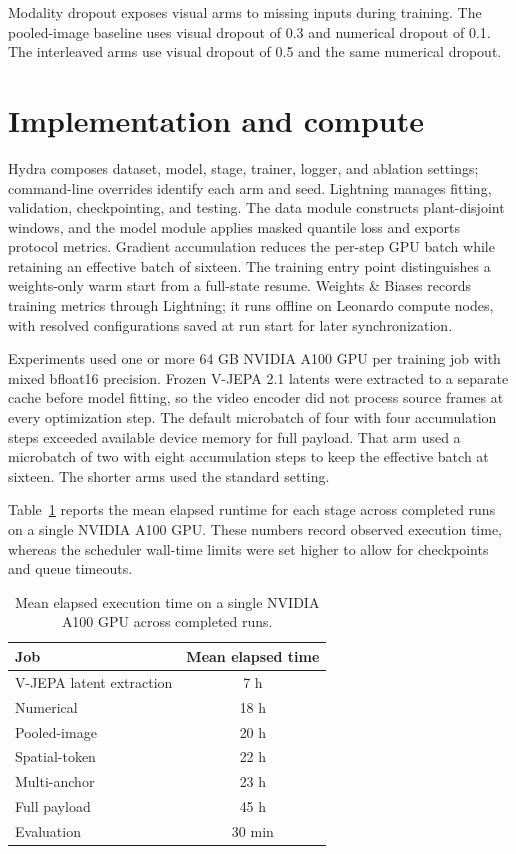 Modality dropout exposes visual arms to missing inputs during training. The pooled-image baseline uses visual dropout of 0.3 and numerical dropout of 0.1. The interleaved arms use visual dropout of 0.5 and the same numerical dropout.

\section{Implementation and compute}

Hydra composes dataset, model, stage, trainer, logger, and ablation settings; command-line overrides identify each arm and seed. Lightning manages fitting, validation, checkpointing, and testing. The data module constructs plant-disjoint windows, and the model module applies masked quantile loss and exports protocol metrics. Gradient accumulation reduces the per-step GPU batch while retaining an effective batch of sixteen. The training entry point distinguishes a weights-only warm start from a full-state resume. Weights \& Biases records training metrics through Lightning; it runs offline on Leonardo compute nodes, with resolved configurations saved at run start for later synchronization.

Experiments used one or more 64 GB NVIDIA A100 GPU per training job with mixed bfloat16 precision. Frozen V-JEPA 2.1 latents were extracted to a separate cache before model fitting, so the video encoder did not process source frames at every optimization step. The default microbatch of four with four accumulation steps exceeded available device memory for full payload. That arm used a microbatch of two with eight accumulation steps to keep the effective batch at sixteen. The shorter arms used the standard setting.

Table~\ref{tab:compute-budget} reports the mean elapsed runtime for each stage across completed runs on a single NVIDIA A100 GPU. These numbers record observed execution time, whereas the scheduler wall-time limits were set higher to allow for checkpoints and queue timeouts.

\begin{table}[htbp]
\centering
\begin{tabular}{@{}lc@{}}
\hline
Job & Mean elapsed time \\
\hline
V-JEPA latent extraction & 7 h \\
Numerical & 18 h \\
Pooled-image & 20 h \\
Spatial-token & 22 h \\
Multi-anchor & 23 h \\
Full payload & 45 h \\
Evaluation & 30 min \\
\hline
\end{tabular}
\caption{Mean elapsed execution time on a single NVIDIA A100 GPU across completed runs.}
\label{tab:compute-budget}
\end{table}


